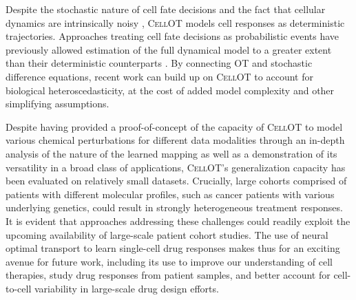 Despite the stochastic nature of cell fate decisions and the fact that cellular dynamics are intrinsically noisy \cite{wilkinson2009}, \textsc{CellOT} models cell responses as deterministic trajectories.
Approaches treating cell fate decisions as probabilistic events have previously allowed estimation of the full dynamical model to a greater extent than their deterministic counterparts \cite{bergen2020}.
By connecting OT and stochastic difference equations, recent work \cite{bunne2022, somnath2023} can build up on \textsc{CellOT} to account for biological heteroscedasticity,
at the cost of added model complexity and other simplifying assumptions.

Despite having provided a proof-of-concept of the capacity of \textsc{CellOT} to model various chemical perturbations for different data modalities through an in-depth analysis of the nature of the learned mapping as well as a demonstration of its versatility in a broad class of applications, \textsc{CellOT}'s generalization capacity has been evaluated on relatively small datasets. Crucially, large cohorts comprised of patients with different molecular profiles, such as cancer patients with various underlying genetics, could result in strongly heterogeneous treatment responses.
It is evident that approaches addressing these challenges could readily exploit the upcoming availability of large-scale patient cohort studies.
The use of neural optimal transport to learn single-cell drug responses makes thus for an exciting avenue for future work,
including its use to improve our understanding of cell therapies, study drug responses from patient samples, and better account for cell-to-cell variability in large-scale drug design efforts.
